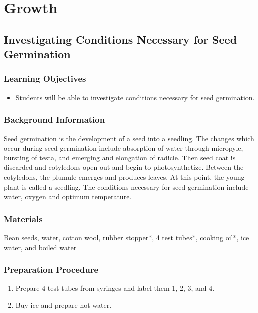 \section{Growth}

\subsection{Investigating Conditions Necessary for Seed Germination}

\subsubsection*{Learning Objectives}
\begin{itemize}
\item{Students will be able to investigate conditions necessary for seed germination.}
\end{itemize}

\subsubsection*{Background Information}
Seed germination is the development of a seed into a seedling. The changes which occur during seed germination include absorption of water through micropyle, bursting of testa, and emerging and elongation of radicle. Then seed coat is discarded and cotyledons open out and begin to photosynthetize. Between the cotyledons, the plumule emerges and produces leaves. At this point, the young plant is called a seedling. The conditions necessary for seed germination include water, oxygen and optimum temperature.

\subsubsection*{Materials}
Bean seeds, water, cotton wool, rubber stopper*, 4 test tubes*, cooking oil*, ice water, and boiled water

\subsubsection*{Preparation Procedure}
\begin{enumerate}
\item{Prepare 4 test tubes from syringes and label them 1, 2, 3, and 4.}
\item{Buy ice and prepare hot water.}
\end{enumerate}

